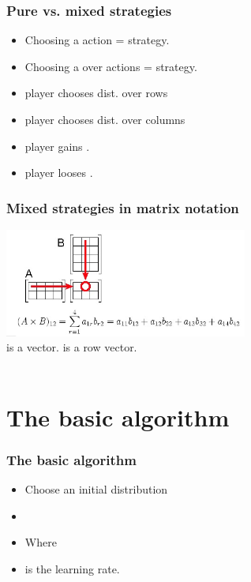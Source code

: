 \documentclass{beamer}
\begin{document}
\begin{frame}
\frametitle{Pure vs. mixed strategies}
\begin{itemize}
\item Choosing a  action =  strategy.
\item Choosing a  over actions =  strategy.
\item {} player chooses dist. over rows \R{$\P$}
\item {} player chooses dist. over columns \R{$\Q$}
\item {} player gains \R{$\M(\P,\Q)$}.
\item {} player looses \R{$\M(\P,\Q)$}.
\end{itemize}
\end{frame}

\begin{frame}
\frametitle{Mixed strategies in matrix notation}
\includegraphics[width=8cm]{figures/matrixProduct.jpg}
\pause \\
\R{$\Q$} is a  vector.  is a row vector.
\pause \\ ~\\
\end{frame}

\section{The basic algorithm}

\begin{frame}
\frametitle{The basic algorithm}
\begin{itemize}
\item Choose an initial distribution 
\item {}
\item Where 
\item {} is the learning rate.
\end{itemize}
\end{frame}
\end{document}
